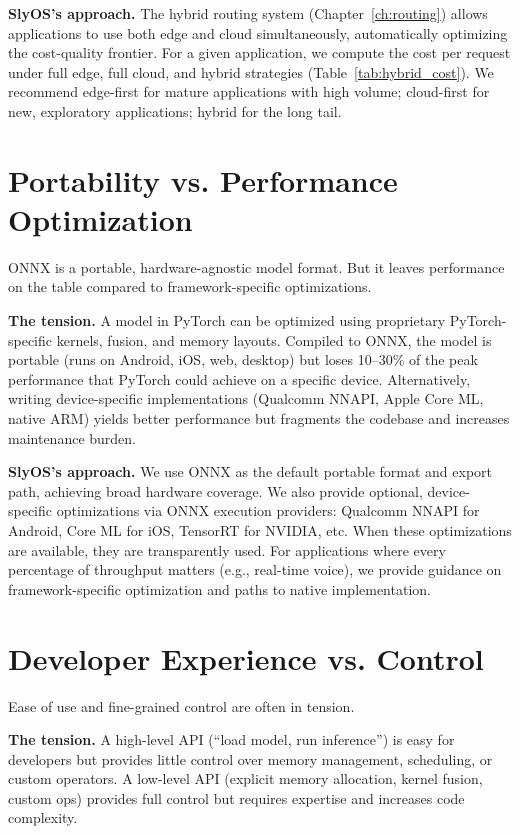 \documentclass[12pt, letterpaper, twoside]{report}
\begin{document}
\textbf{SlyOS's approach.} The hybrid routing system (Chapter~\ref{ch:routing}) allows applications to use both edge and cloud simultaneously, automatically optimizing the cost-quality frontier. For a given application, we compute the cost per request under full edge, full cloud, and hybrid strategies (Table~\ref{tab:hybrid_cost}). We recommend edge-first for mature applications with high volume; cloud-first for new, exploratory applications; hybrid for the long tail.

\section{Portability vs. Performance Optimization}
\label{sec:portability_performance}

ONNX is a portable, hardware-agnostic model format. But it leaves performance on the table compared to framework-specific optimizations.

\textbf{The tension.} A model in PyTorch can be optimized using proprietary PyTorch-specific kernels, fusion, and memory layouts. Compiled to ONNX, the model is portable (runs on Android, iOS, web, desktop) but loses 10--30\% of the peak performance that PyTorch could achieve on a specific device. Alternatively, writing device-specific implementations (Qualcomm NNAPI, Apple Core ML, native ARM) yields better performance but fragments the codebase and increases maintenance burden.

\textbf{SlyOS's approach.} We use ONNX as the default portable format and export path, achieving broad hardware coverage. We also provide optional, device-specific optimizations via ONNX execution providers: Qualcomm NNAPI for Android, Core ML for iOS, TensorRT for NVIDIA, etc. When these optimizations are available, they are transparently used. For applications where every percentage of throughput matters (e.g., real-time voice), we provide guidance on framework-specific optimization and paths to native implementation.

\section{Developer Experience vs. Control}
\label{sec:developer_control}

Ease of use and fine-grained control are often in tension.

\textbf{The tension.} A high-level API (``load model, run inference'') is easy for developers but provides little control over memory management, scheduling, or custom operators. A low-level API (explicit memory allocation, kernel fusion, custom ops) provides full control but requires expertise and increases code complexity.
\end{document}

